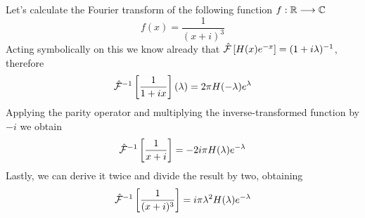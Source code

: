 \documentclass[../complete.tex]{subfiles}
\begin{document}
\begin{eg}
	Let's calculate the Fourier transform of the following function $f:\mathbb{R}\overset{}{\longrightarrow}\mathbb{C}$
	\begin{equation*}
		f(x)=\frac{1}{(x+i)^3}
	\end{equation*}
	Acting symbolically on this we know already that $\hat{\mathcal{F}}\left[ H(x)e^{-x} \right]=(1+i\lambda)^{-1}$, therefore
	\begin{equation*}
		\hat{\mathcal{F}}^{-1}\left[ \frac{1}{1+ix} \right](\lambda)=2\pi H(-\lambda)e^{\lambda}
	\end{equation*}
	Applying the parity operator and multiplying the inverse-transformed function by $-i$ we obtain
	\begin{equation*}
		\hat{\mathcal{F}}^{-1}\left[ \frac{1}{x+i} \right]=-2i\pi H(\lambda)e^{-\lambda}
	\end{equation*}
	Lastly, we can derive it twice and divide the result by two, obtaining
	\begin{equation*}
		\hat{\mathcal{F}}^{-1}\left[ \frac{1}{(x+i)^3} \right]=i\pi\lambda^2H(\lambda)e^{-\lambda}
	\end{equation*}
\end{eg}
\end{document}
